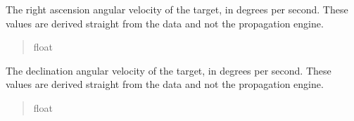 \documentclass[letterpaper,11pt,english]{sphinxmanual}
\begin{document}
\begin{savenotes}
\begin{fulllineitems}
\begin{savenotes}\begin{fulllineitems}
\label{\detokenize{code/opihiexarata.propagate.solution:opihiexarata.propagate.solution.PropagativeSolution.raw_ra_velocity}}
\pysigstartsignatures
{}
\pysigstopsignatures
\sphinxAtStartPar
The right ascension angular velocity of the target, in degrees per
second. These values are derived straight from the data and not the
propagation engine.
\begin{quote}\begin{description}
\sphinxAtStartPar
float

\end{description}\end{quote}

\end{fulllineitems}\end{savenotes}


\begin{savenotes}\begin{fulllineitems}
\label{\detokenize{code/opihiexarata.propagate.solution:opihiexarata.propagate.solution.PropagativeSolution.raw_dec_velocity}}
\pysigstartsignatures
{}
\pysigstopsignatures
\sphinxAtStartPar
The declination angular velocity of the target, in degrees per
second. These values are derived straight from the data and not the
propagation engine.
\begin{quote}\begin{description}
\sphinxAtStartPar
float

\end{description}\end{quote}

\end{fulllineitems}\end{savenotes}



\end{fulllineitems}
\end{savenotes}
\end{document}
